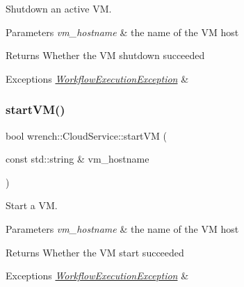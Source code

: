 Shutdown an active VM. 


\begin{DoxyParams}{Parameters}
{\em vm\+\_\+hostname} & the name of the VM host\\
\hline
\end{DoxyParams}
\begin{DoxyReturn}{Returns}
Whether the VM shutdown succeeded
\end{DoxyReturn}

\begin{DoxyExceptions}{Exceptions}
{\em \hyperlink{classwrench_1_1_workflow_execution_exception}{Workflow\+Execution\+Exception}} & \\
\hline
\end{DoxyExceptions}
\mbox{\label{classwrench_1_1_cloud_service_a1a074e4259a9f1e786dab385ccf39e62}} 
\subsubsection{\texorpdfstring{start\+V\+M()}{startVM()}}
{\footnotesize\ttfamily bool wrench\+::\+Cloud\+Service\+::start\+VM (\begin{DoxyParamCaption}\item[{const std\+::string \&}]{vm\+\_\+hostname }\end{DoxyParamCaption})\hspace{0.3cm}{\ttfamily [virtual]}}



Start a VM. 


\begin{DoxyParams}{Parameters}
{\em vm\+\_\+hostname} & the name of the VM host\\
\hline
\end{DoxyParams}
\begin{DoxyReturn}{Returns}
Whether the VM start succeeded
\end{DoxyReturn}

\begin{DoxyExceptions}{Exceptions}
{\em \hyperlink{classwrench_1_1_workflow_execution_exception}{Workflow\+Execution\+Exception}} & \\
\hline
\end{DoxyExceptions}
\mbox{\label{classwrench_1_1_cloud_service_a06e8a8736b03e38464484aa110625ca3}} 
